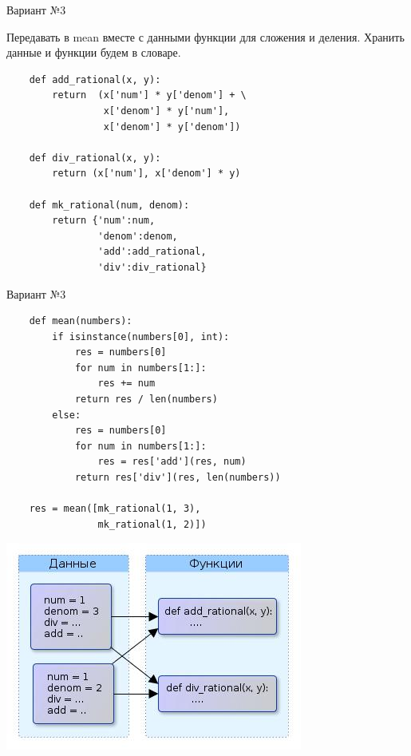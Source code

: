 \documentclass{article}
\begin{document}
\begin{center} Вариант №3 \end{center}
Передавать в mean вместе с данными функции для сложения и деления.
Хранить данные и функции будем в словаре.

\begin{lstlisting}
    def add_rational(x, y):
        return  (x['num'] * y['denom'] + \
                 x['denom'] * y['num'], 
                 x['denom'] * y['denom'])

    def div_rational(x, y):
        return (x['num'], x['denom'] * y)

    def mk_rational(num, denom):
        return {'num':num, 
                'denom':denom, 
                'add':add_rational, 
                'div':div_rational}

\end{lstlisting}
\newpage

\begin{center} Вариант №3 \end{center}
\begin{lstlisting}
    def mean(numbers):
        if isinstance(numbers[0], int):
            res = numbers[0]
            for num in numbers[1:]:
                res += num
            return res / len(numbers)
        else:
            res = numbers[0]
            for num in numbers[1:]:
                res = res['add'](res, num)
            return res['div'](res, len(numbers))

    res = mean([mk_rational(1, 3), 
                mk_rational(1, 2)])
\end{lstlisting}
\newpage

\begin{center} \includegraphics{images/semi_OOP_style.jpg} \end{center} 
\newpage
\end{document}
